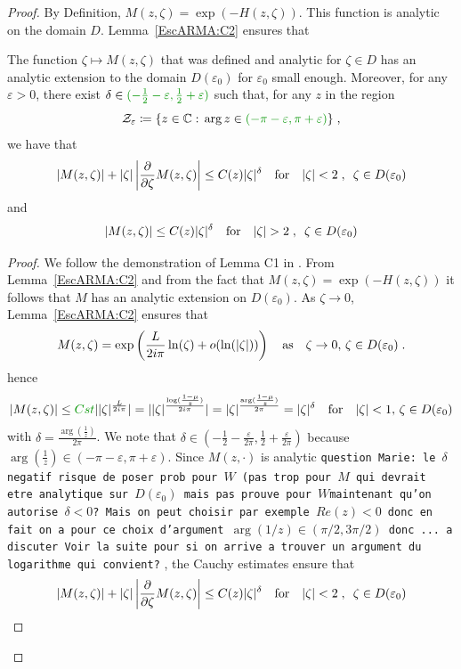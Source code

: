 \documentclass[11pt]{amsart}
\newcommand{\MD}{\color{vert}}
\newcommand{\ep}{\varepsilon}
\newcommand{\f}{\frac}
\begin{document}
\begin{proof}
By Definition, $ M(z, \zeta) = \exp(-H(z, \zeta))$. This function is analytic on the domain $D$. Lemma~\ref{EscARMA:C2} ensures that

\begin{lemma}\label{prop:cptM}The function $\zeta \mapsto M(z,\zeta)$ that was defined and analytic for $\zeta \in D$ has an analytic extension to the domain $D(\varepsilon_0)$ for $\varepsilon_0$ small enough. Moreover, for any $\varepsilon > 0$, there exist $\delta \in {\MD (-\f{1}{2}-\ep,\f{1}{2}+\ep)}$ such that, for any $z$ in the region
    $$ \Zcal_\varepsilon \coloneqq \{ z \in \CC :\, \arg z \in {\MD (-\pi-\varepsilon, \pi +\varepsilon)}\} \eqfinv$$ we have that 
    \begin{equation}
        |M(z, \zeta)| + |\zeta|\left| \frac{\partial}{\partial \zeta}M(z,\zeta)\right|
        \leq 
        C(z) |\zeta|^\delta \quad \text{for} \quad |\zeta| < 2 \; , \enspace \zeta \in D(\varepsilon_0)
    \end{equation}
    and 
    \begin{equation}
        |M(z,\zeta)| \leq C(z)|\zeta|^{\delta} \quad \text{for} \quad |\zeta| > 2 \; , \enspace \zeta \in D(\varepsilon_0)
    \end{equation}
\end{lemma}
\begin{proof}We follow the demonstration of Lemma C1 in \cite{escobedo2007fundamental}. From Lemma~\ref{EscARMA:C2} and from the fact that $M(z, \zeta) = \exp(-H(z,\zeta))$ it follows that $M$ has an analytic extension on $D(\varepsilon_0)$.
As $\zeta \to 0$, Lemma~\ref{EscARMA:C2} ensures that 
$$ M(z, \zeta) = \exp\left(\frac{L}{2i\pi } \ln(\zeta) + o(\ln(|\zeta|)) \right)  \quad \text{as} \quad \zeta\to 0,\, \zeta \in D(\varepsilon_0) \; .$$
hence
$$ \vert {M(z,\zeta)}{} \vert \leq {\MD Cst} \vert {|\zeta|^{\frac{L}{2i\pi}}}\vert=
\vert |\zeta|^{\frac{\log(\frac{1-\mu}{z})}{2i\pi}}\vert = \vert \zeta \vert^{\frac{\arg (\frac{1-\mu}{z})}{2\pi}}=\vert \zeta \vert^\delta
\mtext{for}  \vert \zeta \vert < 1,\, \zeta \in D(\varepsilon_0)$$ with 
 $\delta = \frac{\arg(\frac{1}{z})}{2\pi}$. We note that {\MD $\delta \in (-\f{1}{2}-\f{\ep}{2\pi},\f{1}{2}+\f{\ep}{2\pi})$ because $\arg(\frac{1}{z}) \in (-\pi-\ep, \pi+\ep)$}.
Since {\MD $M(z, \cdot)$ is analytic {\tt question Marie: le $\delta$ negatif risque de poser prob pour $W$ (pas trop pour $M$ qui devrait etre analytique  sur $D(\ep_0)$ mais pas prouve pour $W$maintenant qu'on autorise $\delta<0$? Mais on peut choisir par exemple $Re(z)<0$ donc en fait on a pour ce choix d'argument $\arg(1/z) \in (\pi/2,3\pi/2)$ donc ... a discuter Voir la suite pour si on arrive a trouver un argument du logarithme qui convient?}} , the Cauchy estimates ensure that 
\begin{equation*}
    |M(z, \zeta)| + |\zeta|\left| \frac{\partial}{\partial \zeta}M(z,\zeta)\right|
    \leq 
    C(z) |\zeta|^\delta \quad \text{for} \quad |\zeta| < 2 \; , \enspace \zeta \in D(\varepsilon_0)
\end{equation*}


\end{proof}
\end{proof}
\end{document}
